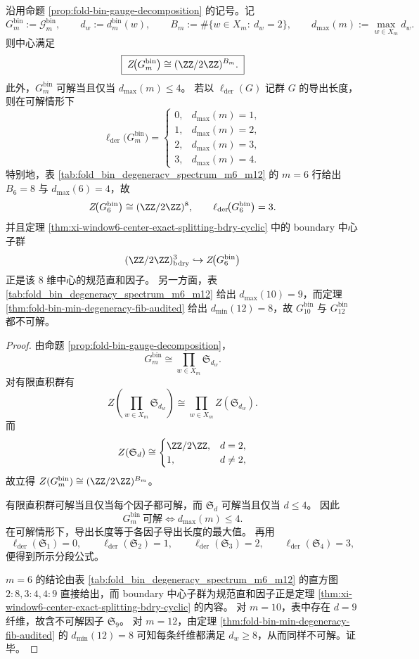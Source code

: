 \begin{theorem}[中心与可解性的纤维判别]\label{thm:xi-foldbin-center-solvable-fiber-criterion}
沿用命题 \ref{prop:fold-bin-gauge-decomposition} 的记号。记
\[
G_m^{\mathrm{bin}}:=\mathcal{G}^{\mathrm{bin}}_m,
\qquad
d_w:=d_m^{\mathrm{bin}}(w),
\qquad
B_m:=\#\{w\in X_m:\ d_w=2\},
\qquad
d_{\max}(m):=\max_{w\in X_m}d_w.
\]
则中心满足
\[
\boxed{\;
Z\!\bigl(G_m^{\mathrm{bin}}\bigr)\cong (\ZZ/2\ZZ)^{B_m}.
\;}
\]
此外，\(G_m^{\mathrm{bin}}\) 可解当且仅当 \(d_{\max}(m)\le 4\)。
若以 \(\ell_{\mathrm{der}}(G)\) 记群 \(G\) 的导出长度，则在可解情形下
\[
\ell_{\mathrm{der}}\!\bigl(G_m^{\mathrm{bin}}\bigr)
=
\begin{cases}
0,& d_{\max}(m)=1,\\
1,& d_{\max}(m)=2,\\
2,& d_{\max}(m)=3,\\
3,& d_{\max}(m)=4.
\end{cases}
\]
特别地，表 \ref{tab:fold_bin_degeneracy_spectrum_m6_m12} 的 \(m=6\) 行给出 \(B_6=8\) 与 \(d_{\max}(6)=4\)，故
\[
Z\!\bigl(G_6^{\mathrm{bin}}\bigr)\cong (\ZZ/2\ZZ)^8,
\qquad
\ell_{\mathrm{der}}\!\bigl(G_6^{\mathrm{bin}}\bigr)=3.
\]
并且定理 \ref{thm:xi-window6-center-exact-splitting-bdry-cyclic} 中的 boundary 中心子群
\[
(\ZZ/2\ZZ)^3_{\mathrm{bdry}}\hookrightarrow Z\!\bigl(G_6^{\mathrm{bin}}\bigr)
\]
正是该 \(8\) 维中心的规范直和因子。
另一方面，表 \ref{tab:fold_bin_degeneracy_spectrum_m6_m12} 给出 \(d_{\max}(10)=9\)，而定理 \ref{thm:fold-bin-min-degeneracy-fib-audited} 给出 \(d_{\min}(12)=8\)，故 \(G_{10}^{\mathrm{bin}}\) 与 \(G_{12}^{\mathrm{bin}}\) 都不可解。
\end{theorem}
\begin{proof}
由命题 \ref{prop:fold-bin-gauge-decomposition}，
\[
G_m^{\mathrm{bin}}
\cong
\prod_{w\in X_m}\mathfrak S_{d_w}.
\]
对有限直积群有
\[
Z\!\left(\prod_{w\in X_m}\mathfrak S_{d_w}\right)
\cong
\prod_{w\in X_m}Z(\mathfrak S_{d_w}).
\]
而
\[
Z(\mathfrak S_d)\cong
\begin{cases}
\ZZ/2\ZZ,& d=2,\\
1,& d\neq 2,
\end{cases}
\]
故立得 \(Z(G_m^{\mathrm{bin}})\cong (\ZZ/2\ZZ)^{B_m}\)。

有限直积群可解当且仅当每个因子都可解，而 \(\mathfrak S_d\) 可解当且仅当 \(d\le 4\)。
因此
\[
G_m^{\mathrm{bin}}\ \text{可解}
\iff
d_{\max}(m)\le 4.
\]
在可解情形下，导出长度等于各因子导出长度的最大值。
再用
\[
\ell_{\mathrm{der}}(\mathfrak S_1)=0,\qquad
\ell_{\mathrm{der}}(\mathfrak S_2)=1,\qquad
\ell_{\mathrm{der}}(\mathfrak S_3)=2,\qquad
\ell_{\mathrm{der}}(\mathfrak S_4)=3,
\]
便得到所示分段公式。

\(m=6\) 的结论由表 \ref{tab:fold_bin_degeneracy_spectrum_m6_m12} 的直方图 \(2:8,3:4,4:9\) 直接给出，而 boundary 中心子群为规范直和因子正是定理 \ref{thm:xi-window6-center-exact-splitting-bdry-cyclic} 的内容。
对 \(m=10\)，表中存在 \(d=9\) 纤维，故含不可解因子 \(\mathfrak S_9\)。
对 \(m=12\)，由定理 \ref{thm:fold-bin-min-degeneracy-fib-audited} 的 \(d_{\min}(12)=8\) 可知每条纤维都满足 \(d_w\ge 8\)，从而同样不可解。证毕。
\end{proof}

\endinput
